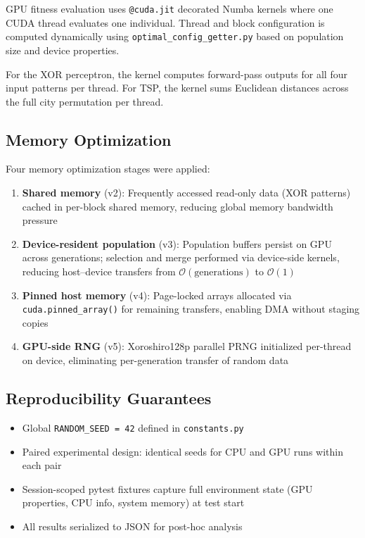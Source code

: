 \documentclass[a4paper,14pt]{extarticle}
\begin{document}
GPU fitness evaluation uses \texttt{@cuda.jit} decorated Numba kernels where one CUDA thread
evaluates one individual. Thread and block configuration is computed dynamically using
\texttt{optimal\_config\_getter.py} based on population size and device properties.

For the XOR perceptron, the kernel computes forward-pass outputs for all four input patterns
per thread. For TSP, the kernel sums Euclidean distances across the full city permutation per
thread.

\subsection{Memory Optimization}

Four memory optimization stages were applied:

\begin{enumerate}
  \item \textbf{Shared memory} (v2): Frequently accessed read-only data (XOR patterns)
        cached in per-block shared memory, reducing global memory bandwidth
        pressure~\cite{nvidia2011cuda}
  \item \textbf{Device-resident population} (v3): Population buffers persist on GPU across
        generations; selection and merge performed via device-side kernels, reducing
        host--device transfers from $\mathcal{O}(\text{generations})$ to
        $\mathcal{O}(1)$~\cite{harris2012optimize}
  \item \textbf{Pinned host memory} (v4): Page-locked arrays allocated via
        \texttt{cuda.pinned\_array()} for remaining transfers, enabling DMA without
        staging copies~\cite{nvidia2024cuda}
  \item \textbf{GPU-side RNG} (v5): Xoroshiro128p parallel PRNG initialized per-thread on
        device, eliminating per-generation transfer of random data~\cite{xoroshiro}
\end{enumerate}

\subsection{Reproducibility Guarantees}

\begin{itemize}
  \item Global \texttt{RANDOM\_SEED = 42} defined in \texttt{constants.py}
  \item Paired experimental design: identical seeds for CPU and GPU runs within each pair
  \item Session-scoped pytest fixtures capture full environment state (GPU properties, CPU
        info, system memory) at test start
  \item All results serialized to JSON for post-hoc analysis
\end{itemize}
\end{document}

